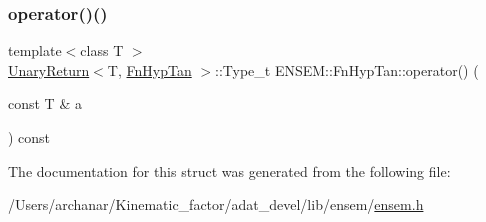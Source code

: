 \mbox{\label{structENSEM_1_1FnHypTan_a2a798b36a9dd79d1189263a0c58e0def}} 
\subsubsection{\texorpdfstring{operator()()}{operator()()}\hspace{0.1cm}{\footnotesize\ttfamily [2/2]}}
{\footnotesize\ttfamily template$<$class T $>$ \\
\mbox{\hyperlink{structENSEM_1_1UnaryReturn}{Unary\+Return}}$<$T, \mbox{\hyperlink{structENSEM_1_1FnHypTan}{Fn\+Hyp\+Tan}} $>$\+::Type\+\_\+t E\+N\+S\+E\+M\+::\+Fn\+Hyp\+Tan\+::operator() (\begin{DoxyParamCaption}\item[{const T \&}]{a }\end{DoxyParamCaption}) const\hspace{0.3cm}{\ttfamily [inline]}}



The documentation for this struct was generated from the following file\+:\begin{DoxyCompactItemize}
\item 
/\+Users/archanar/\+Kinematic\+\_\+factor/adat\+\_\+devel/lib/ensem/\mbox{\hyperlink{lib_2ensem_2ensem_8h}{ensem.\+h}}\end{DoxyCompactItemize}
